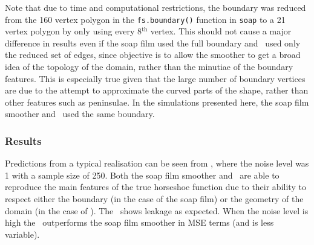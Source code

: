 Note that due to time and computational restrictions, the boundary was reduced from the 160 vertex polygon in the \texttt{fs.boundary()} function in \texttt{soap} to a 21 vertex polygon by only using every 8$^\text{th}$ vertex. This should not cause a major difference in results even if the soap film used the full boundary and \mdsap\ used only the reduced set of edges, since objective is to allow the smoother to get a broad idea of the topology of the domain, rather than the minutiae of the boundary features. This is especially true given that the large number of boundary vertices are due to the attempt to approximate the curved parts of the shape, rather than other features such as peninsulae. In the simulations presented here, the soap film smoother and \mdsap\ used the same boundary.

\subsubsection{Results}

Predictions from a typical realisation can be seen from , where the noise level was 1 with a sample size of 250. Both the soap film smoother and \mdsap\ are able to reproduce the main features of the true horseshoe function due to their ability to respect either the boundary (in the case of the soap film) or the geometry of the domain (in the case of \mdsap). The \tprs\ shows leakage as expected. When the noise level is high the \mdsap\ outperforms the soap film smoother in MSE terms (and is less variable).


